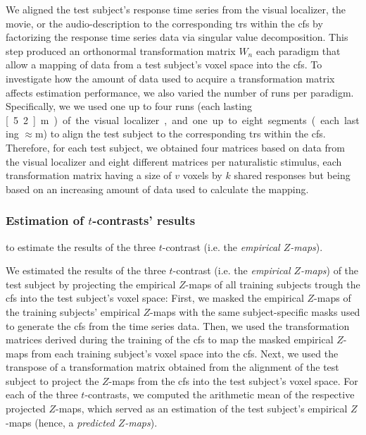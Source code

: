 %
We aligned the test subject's response time series from the visual localizer,
the movie, or the audio-description to the corresponding \acp{tr} within the
\ac{cfs} by factorizing the response time series data via singular value
decomposition.
%
This step produced an orthonormal transformation matrix $W_{n}$ each paradigm
that allow a mapping of data from a test subject's voxel space into the
\ac{cfs}.
%
To investigate how the amount of data used to acquire a transformation matrix
affects estimation performance, we also varied the number of runs per paradigm.
%
Specifically, we we used one up to four runs (each lasting \unit[5.2]{m}) of the
visual localizer, and one up to eight segments (each lasting
$\approx$\unit[15]{m}) to align the test subject to the corresponding \acp{tr}
within the \ac{cfs}.
%
Therefore, for each test subject, we obtained four matrices based on data from
the visual localizer and eight different matrices per naturalistic stimulus,
each transformation matrix having a size of $v$ voxels by $k$ shared responses
but being based on an increasing amount of data used to calculate the mapping.


\subsubsection{Estimation of $t$-contrasts' results}

to estimate the results of
the three $t$-contrast (i.e. the \textit{empirical $Z$-maps}).


We estimated the results of the three $t$-contrast (i.e. the \textit{empirical
$Z$-maps}) of the test subject by projecting the empirical $Z$-maps of all
training subjects trough the \ac{cfs} into the test subject's voxel space:
First, we masked the empirical $Z$-maps of the training subjects' empirical
$Z$-maps with the same subject-specific masks used to generate the \ac{cfs} from
the time series data.
%
Then,  we used the transformation matrices derived during the training of the
\ac{cfs} to map the masked empirical $Z$-maps from each training subject's voxel
space into the \ac{cfs}.
%
Next, we used the transpose of a transformation matrix obtained from the
alignment of the test subject to project the $Z$-maps from the \ac{cfs} into the
test subject's voxel space.
For each of the three $t$-contrasts, we computed the arithmetic mean of the
respective projected $Z$-maps, which served as an estimation of the test
subject's empirical $Z$-maps (hence, a \textit{predicted $Z$-maps}).


